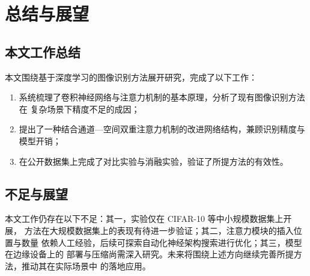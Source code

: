 \section{总结与展望}

\subsection{本文工作总结}

\quad 本文围绕基于深度学习的图像识别方法展开研究，完成了以下工作：
\begin{enumerate}
  \item 系统梳理了卷积神经网络与注意力机制的基本原理，分析了现有图像识别方法在
        复杂场景下精度不足的成因；
  \item 提出了一种结合通道—空间双重注意力机制的改进网络结构，兼顾识别精度与
        模型开销；
  \item 在公开数据集上完成了对比实验与消融实验，验证了所提方法的有效性。
\end{enumerate}

\subsection{不足与展望}

\quad 本文工作仍存在以下不足：其一，实验仅在 CIFAR-10 等中小规模数据集上开展，
方法在大规模数据集上的表现有待进一步验证；其二，注意力模块的插入位置与数量
依赖人工经验，后续可探索自动化神经架构搜索进行优化；其三，模型在边缘设备上的
部署与压缩尚需深入研究。未来将围绕上述方向继续完善所提方法，推动其在实际场景中
的落地应用。
